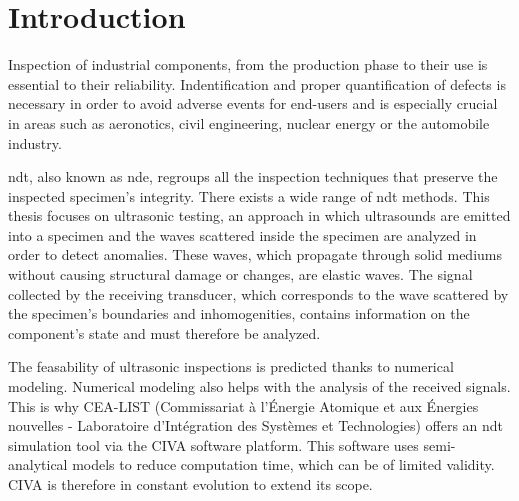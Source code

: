 \chapter*{Introduction}
Inspection of industrial components, from the production phase to their use is essential to their reliability. Indentification and proper quantification of defects is necessary in order to avoid adverse events for end-users and is especially crucial in areas such as aeronotics, civil engineering, nuclear energy or the automobile industry. 

\acrfull{ndt}, also known as \acrfull{nde}, regroups all the inspection techniques that preserve the inspected specimen's integrity. There exists a wide range of \acrshort{ndt} methods. This thesis focuses on ultrasonic testing, an approach in which ultrasounds are emitted into a specimen and the waves scattered inside the specimen are analyzed in order to detect anomalies. These waves, which propagate through solid mediums without causing structural damage or changes, are elastic waves. The signal collected by the receiving transducer, which corresponds to the wave scattered by the specimen's boundaries and inhomogenities, contains information on the component's state and must therefore be analyzed.

The feasability of ultrasonic inspections is predicted thanks to numerical modeling. Numerical modeling also helps with the analysis of the received signals. This is why CEA-LIST (Commissariat à l’Énergie Atomique et aux Énergies nouvelles - Laboratoire d’Intégration des Systèmes et Technologies) offers an \acrshort{ndt} simulation tool via the CIVA software platform. This software uses semi-analytical models to reduce computation time, which can be of limited validity. CIVA is therefore in constant evolution to extend its scope.



